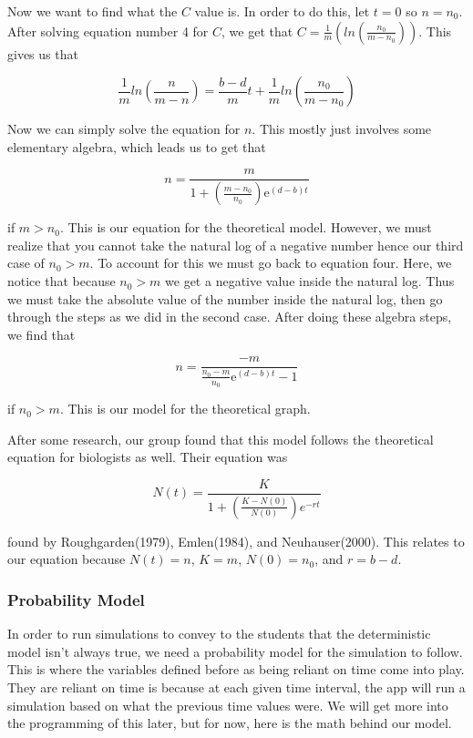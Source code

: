 \documentclass{article}\usepackage[]{graphicx}\usepackage[]{color}
\begin{document}
Now we want to find what the \(C\) value is. In order to do this, let \(t=0\) so \(n=n_0\). After solving equation number 4 for \(C\), we get that \(C = \frac{1}{m}(ln(\frac{n_0}{m-n_0}))\). This gives us that 

\begin{equation}
\frac{1}{m} ln(\frac{n}{m-n}) = \frac{b-d}{m}t + \frac{1}{m}ln(\frac{n_0}{m-n_0})
\end{equation}

\noindent Now we can simply solve the equation for \(n\). This mostly just involves some elementary algebra, which leads us to get that 

\begin{equation}
n = \frac{m}{1+(\frac{m-n_0}{n_0})\mathrm{e}^{(d-b)t}}
\end{equation}

\noindent if \(m > n_0\). This is our equation for the theoretical model. However, we must realize that you cannot take the natural log of a negative number hence our third case of \(n_0 >m\). To account for this we must go back to equation four. Here, we notice that because \(n_0 > m\) we get a negative value inside the natural log. Thus we must take the absolute value of the number inside the natural log, then go through the steps as we did in the second case. After doing these algebra steps, we find that 

\begin{equation}
n= \frac{-m}{\frac{n_0-m}{n_0}\mathrm{e}^{(d-b)t}-1}
\end{equation}

if \(n_0 > m\). This is our model for the theoretical graph. 

\bigskip

After some research, our group found that this model follows the theoretical equation for biologists as well. Their equation was 

\begin{equation}
N(t) = \frac{K}{1+(\frac{K-N(0)}{N(0)})e^{-rt}}
\end{equation}

\noindent found by Roughgarden(1979), Emlen(1984), and Neuhauser(2000). This relates to our equation because \(N(t) = n\), \(K=m\), \(N(0)=n_0\), and \(r = b-d\).

\subsubsection{Probability Model}

In order to run simulations to convey to the students that the deterministic model isn't always true, we need a probability model for the simulation to follow. This is where the variables defined before as being reliant on time come into play. They are reliant on time is because at each given time interval, the app will run a simulation based on what the previous time values were. We will get more into the programming of this later, but for now, here is the math behind our model.
\end{document}
